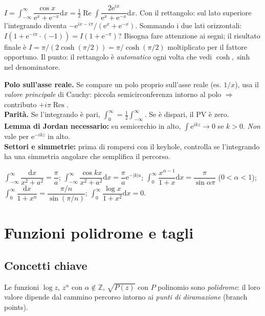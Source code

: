 \documentclass[11pt,a4paper,openany]{book}
\theoremstyle{definition}
\newcommand{\Z}{\mathbb{Z}}
\newcommand{\dd}{\mathrm{d}}
\newcommand{\eu}{\mathrm{e}}
\renewcommand{\Re}{\operatorname{Re}}
\DeclareMathOperator{\Res}{Res}
\begin{document}
\begin{esempio}[Scritto 10/09/2024, Es. 2]
$I=\int_{-\infty}^\infty\dfrac{\cos x}{\eu^x+\eu^{-x}}\dd x=\tfrac 1 2\Re\int\dfrac{2\eu^{ix}}{\eu^x+\eu^{-x}}\dd x$. Con il rettangolo: sul lato superiore l'integrando diventa $-\eu^{ix-i\pi}/(\eu^x+\eu^{-x})$. Sommando i due lati orizzontali: $I(1+\eu^{-i\pi}\cdot(-1))=I(1+\eu^{-\pi})$? Bisogna fare attenzione ai segni; il risultato finale \`e $I=\pi/(2\cosh(\pi/2))=\pi/\cosh(\pi/2)$ moltiplicato per il fattore opportuno. Il punto: il rettangolo \`e \emph{automatico} ogni volta che vedi $\cosh,\sinh$ nel denominatore.
\end{esempio}

\begin{trucco}
\textbf{Polo sull'asse reale.} Se compare un polo proprio sull'asse reale (es. $1/x$), usa il \emph{valore principale} di Cauchy: piccola semicirconferenza intorno al polo $\Rightarrow$ contributo $+i\pi\Res$.\\
\textbf{Parit\`a.} Se l'integrando \`e pari, $\int_0^\infty=\tfrac 1 2\int_{-\infty}^\infty$. Se \`e dispari, il PV \`e zero.\\
\textbf{Lemma di Jordan necessario:} su semicerchio in alto, $\int\eu^{ikz}\to 0$ se $k>0$. \emph{Non} vale per $\eu^{-ikz}$ in alto.\\
\textbf{Settori e simmetrie:} prima di rompersi con il keyhole, controlla se l'integrando ha una simmetria angolare che semplifica il percorso.
\end{trucco}

\begin{formulario}
$\int_{-\infty}^\infty\dfrac{\dd x}{x^2+a^2}=\dfrac{\pi}{a}$;
$\int_{-\infty}^\infty\dfrac{\cos kx}{x^2+a^2}\dd x=\dfrac{\pi}{a}\eu^{-|k|a}$;
$\int_0^\infty\dfrac{x^{\alpha-1}}{1+x}\dd x=\dfrac{\pi}{\sin\alpha\pi}$ ($0<\alpha<1$);
$\int_0^\infty\dfrac{\dd x}{1+x^n}=\dfrac{\pi/n}{\sin(\pi/n)}$;
$\int_0^\infty\dfrac{\log x}{1+x^2}\dd x=0$.
\end{formulario}

\chapter{Funzioni polidrome e tagli}\label{ch:polidrome}

\section{Concetti chiave}
Le funzioni $\log z$, $z^\alpha$ con $\alpha\notin\Z$, $\sqrt{P(z)}$ con $P$ polinomio sono \emph{polidrome}: il loro valore dipende dal cammino percorso intorno ai \emph{punti di diramazione} (branch points).
\end{document}
